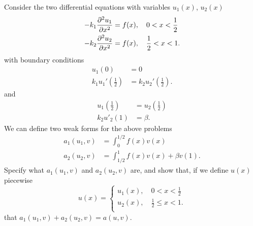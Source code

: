 \begin{enumerate}
  Consider the two differential equations with variables $u_1(x)$, $u_2(x)$
 \begin{align*}
-k_1\frac{\partial^{2} u_1}{\partial x^{2}} &= f(x), \quad 0 < x < \frac{1}{2}\\
-k_2\frac{\partial^{2} u_2}{\partial x^{2}} &= f(x), \quad \frac{1}{2} < x < 1.
 \end{align*}
 with boundary conditions 
 \begin{align*}
 u_1(0) &= 0\\
k_1 u_1'\left(\frac{1}{2}\right) &= k_2u_2'\left(\frac{1}{2}\right).
 \end{align*}
and
 \begin{align*}
u_1\left(\frac{1}{2}\right) &= u_2\left(\frac{1}{2}\right)\\
 k_2 u'_2(1) &= \beta.
 \end{align*}
We can define two weak forms for the above problems 
 \begin{align*}
a_1(u_1 ,v) &= \int_0^{1/2}f(x)v(x)\\
a_2(u_2 ,v) &= \int_{1/2}^{1}f(x)v(x) + \beta v(1).  
 \end{align*}
Specify what $a_1(u_1,v)$ and $a_2(u_2,v)$ are, and show that, if we define $u(x)$ piecewise
\[
u(x) = \begin{cases}
u_1(x), \quad 0 < x < \frac{1}{2}\\
u_2(x), \quad \frac{1}{2} \leq x < 1.\\
\end{cases}
\]
that $a_1(u_1,v) + a_2(u_2,v) = a(u,v).$

 \end{enumerate}
